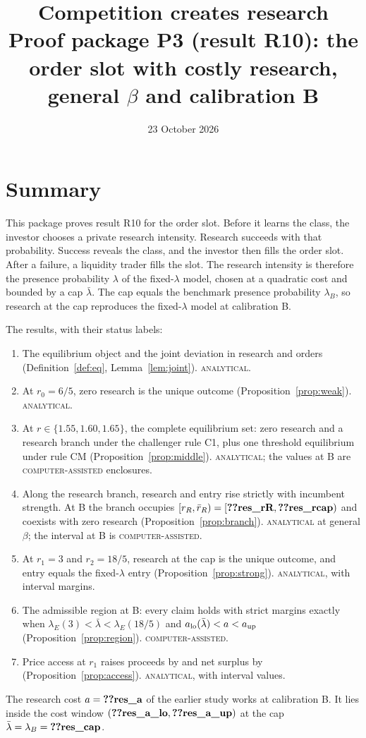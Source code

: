 \documentclass[12pt]{article}
\title{Competition creates research\\
\large Proof package P3 (result R10): the order slot with costly research, general $\beta$ and calibration B}
\author{}
\date{23 October 2026}
\theoremstyle{definition}
\theoremstyle{remark}
\newcommand{\lb}{\bar\lambda}
\newcommand{\st}[1]{\textsc{#1}}
\begin{document}
\maketitle

\section*{Summary}

This package proves result R10 for the order slot. Before it learns the class, the investor chooses a private
research intensity. Research succeeds with that probability. Success reveals the class, and the investor then
fills the order slot. After a failure, a liquidity trader fills the slot. The research intensity is therefore the
presence probability $\lambda$ of the fixed-$\lambda$ model, chosen at a quadratic cost and bounded by a cap
$\lb$. The cap equals the benchmark presence probability $\lambda_B$, so research at the cap reproduces the
fixed-$\lambda$ model at calibration B.

The results, with their status labels:
\begin{enumerate}[label=(\arabic*),nosep]
\item The equilibrium object and the joint deviation in research and orders (Definition~\ref{def:eq},
  Lemma~\ref{lem:joint}). \st{analytical}.
\item At $r_0=6/5$, zero research is the unique outcome (Proposition~\ref{prop:weak}). \st{analytical}.
\item At $r\in\{1.55,1.60,1.65\}$, the complete equilibrium set: zero research and a research branch under the
  challenger rule C1, plus one threshold equilibrium under rule CM (Proposition~\ref{prop:middle}).
  \st{analytical}; the values at B are \st{computer-assisted} enclosures.
\item Along the research branch, research and entry rise strictly with incumbent strength. At B the branch
  occupies $[r_R,\bar r_R)=[\reg{res_rR},\reg{res_rcap})$ and coexists with zero research
  (Proposition~\ref{prop:branch}). \st{analytical} at general $\beta$; the interval at B is
  \st{computer-assisted}.
\item At $r_1=3$ and $r_2=18/5$, research at the cap is the unique outcome, and entry equals the fixed-$\lambda$
  entry (Proposition~\ref{prop:strong}). \st{analytical}, with interval margins.
\item The admissible region at B: every claim holds with strict margins exactly when
  $\lambda_E(3)<\lb<\lambda_E(18/5)$ and $a_{\rm lo}(\lb)<a<a_{\rm up}$ (Proposition~\ref{prop:region}).
  \st{computer-assisted}.
\item Price access at $r_1$ raises proceeds by  and net surplus by 
  (Proposition~\ref{prop:access}). \st{analytical}, with interval values.
\end{enumerate}
The research cost $a=\reg{res_a}$ of the earlier study works at calibration B. It lies inside the cost window
$(\reg{res_a_lo},\reg{res_a_up})$ at the cap $\lb=\lambda_B=\reg{res_cap}$.
\end{document}
